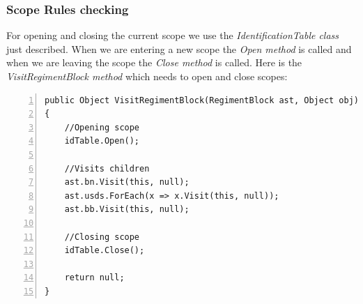 		\subsubsection{Scope Rules checking}
			For opening and closing the current scope we use the {\it IdentificationTable class} just described.
			When we are entering a new scope the {\it Open method} is called and when we are leaving the scope the {\it Close method} is called.
			Here is the {\it VisitRegimentBlock method} which needs to open and close scopes: \\
			\begin{lstlisting}[basicstyle=\small\sffamily,
					keywords={break,case,const,continue,default,else,enum,
					for,if,return,switch,while,do,long,void,int,float,double,
					char,struct,typedef,include,size\_t},
					keywordstyle={\color{blue}},
					comment={[l]{//}}, morecomment={[s]{/*}{*/}}, commentstyle=\itshape,
					columns={[l]flexible}, numbers=left, numberstyle=\tiny,
					frameround=fftt, frame=shadowbox, captionpos=b,
					caption={The IdentificationTable class},
					label=impl:idtable]
public Object VisitRegimentBlock(RegimentBlock ast, Object obj)
{
	//Opening scope
	idTable.Open();
	
	//Visits children
    ast.bn.Visit(this, null);
    ast.usds.ForEach(x => x.Visit(this, null));
    ast.bb.Visit(this, null);
    
    //Closing scope
    idTable.Close();
    
	return null;
}
			 \end{lstlisting}
		
